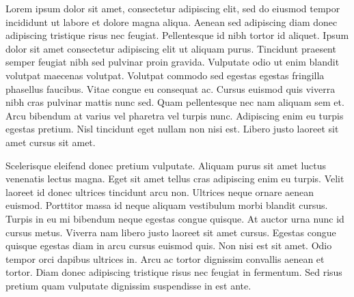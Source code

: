 Lorem ipsum dolor sit amet, consectetur adipiscing elit, sed do eiusmod tempor incididunt ut labore et dolore magna aliqua. Aenean sed adipiscing diam donec adipiscing tristique risus nec feugiat. Pellentesque id nibh tortor id aliquet. Ipsum dolor sit amet consectetur adipiscing elit ut aliquam purus. Tincidunt praesent semper feugiat nibh sed pulvinar proin gravida. Vulputate odio ut enim blandit volutpat maecenas volutpat. Volutpat commodo sed egestas egestas fringilla phasellus faucibus. Vitae congue eu consequat ac. Cursus euismod quis viverra nibh cras pulvinar mattis nunc sed. Quam pellentesque nec nam aliquam sem et. Arcu bibendum at varius vel pharetra vel turpis nunc. Adipiscing enim eu turpis egestas pretium. Nisl tincidunt eget nullam non nisi est. Libero justo laoreet sit amet cursus sit amet.

Scelerisque eleifend donec pretium vulputate. Aliquam purus sit amet luctus venenatis lectus magna. Eget sit amet tellus cras adipiscing enim eu turpis. Velit laoreet id donec ultrices tincidunt arcu non. Ultrices neque ornare aenean euismod. Porttitor massa id neque aliquam vestibulum morbi blandit cursus. Turpis in eu mi bibendum neque egestas congue quisque. At auctor urna nunc id cursus metus. Viverra nam libero justo laoreet sit amet cursus. Egestas congue quisque egestas diam in arcu cursus euismod quis. Non nisi est sit amet. Odio tempor orci dapibus ultrices in. Arcu ac tortor dignissim convallis aenean et tortor. Diam donec adipiscing tristique risus nec feugiat in fermentum. Sed risus pretium quam vulputate dignissim suspendisse in est ante.
\cite{effect_human_cells}